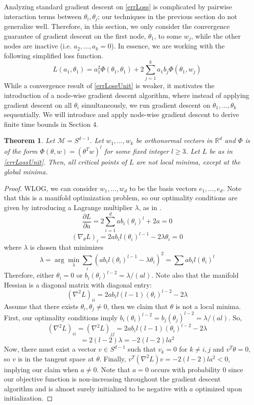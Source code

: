 \documentclass{article}
\newtheorem{theorem}{Theorem}[section]
\newcommand{\R}{{\mathbb{R}}}
\newcommand{\pd}[2]{\frac{\partial#1}{\partial#2}}
\begin{document}
Analyzing standard gradient descent on \eqref{errLoss} is complicated by pairwise interaction terms between $\theta_i, \theta_j$; our techniques in the previous section do not generalize well. Therefore, in this section, we only consider the convergence guarantee of gradient descent on the first node, $\theta_1$, to some $w_j$, while the other nodes are inactive (i.e. $a_2,...,a_k = 0$). In essence, we are working with the following simplified loss function.
\begin{equation}\label{errLossUnit}
L(a_1,\theta_1) =  a_1^2 \Phi(\theta_1,\theta_1)  + 2\sum_{j=1}^k a_1b_j \Phi(\theta_1,w_j)
\end{equation}
While a convergence result of \eqref{errLossUnit} is weaker, it motivates the introduction of a node-wise gradient descent algorithm, where instead of applying gradient descent on all $\theta_i$ simultaneously, we run gradient descent on $\theta_1,...,\theta_k$ sequentially. We will introduce and apply node-wise gradient descent to derive finite time bounds in Section 4.
\begin{theorem}
\label{PolyStrict}
Let $\mathcal{M} = S^{d-1}$. Let $w_1,...,w_k$ be orthonormal vectors in $\R^d$ and $\Phi$ is of the form $\Phi(\theta,w) = (\theta^Tw)^l$ for some fixed integer $l \geq 3$. Let $L$ be as in \eqref{errLossUnit}. Then, all critical points of $L$ are not local minima, except at the global minima. 
\end{theorem}
\begin{proof}
WLOG, we can consider $w_1,...,w_d$ to be the basis vectors $e_1,...,e_d$. Note that this is a manifold optimization problem, so our optimality conditions are given by introducing a Lagrange multiplier $\lambda$, as in \cite{GeHJY15}.
\[\pd{L}{a} = 2\sum_{i=1}^d ab_i (\theta_i)^l + 2a = 0\]
\[ (\nabla_\theta L)_i = 2ab_il(\theta_i)^{l-1}  -2\lambda \theta_i = 0 \]
where $\lambda$ is chosen that minimizes 
\[\lambda = \arg \min_\lambda \sum_i (ab_i l (\theta_i)^{l-1} - \lambda\theta_i)^2 = \sum ab_i l (\theta_i)^l \]
Therefore, either $\theta_i = 0$ or $b_i (\theta_i)^{l-2} = \lambda/(al)$. Note also that the manifold Hessian is a diagonal matrix with diagonal entry: 
\[(\nabla^2 L)_{ii} = 2a b_i l(l-1)(\theta_i)^{l-2} - 2 \lambda\]
Assume that there exists $\theta_i, \theta_j \neq 0$, then we claim that $\theta$ is not a local minima.  First, our optimality conditions imply $b_i(\theta_i)^{l-2} = b_j (\theta_j)^{l-2} = \lambda/(al)$. So,
\[(\nabla^2 L)_{ii} = (\nabla^2L)_{jj} = 2a b_i l(l-1)(\theta_i)^{l-2} - 2 \lambda\]
\[ = 2(l-2)\lambda = -2(l-2)la^2\]
Now, there must exist a vector $v \in S^{d-1}$ such that $v_k = 0$ for $k \neq i,j$ and $v^T\theta = 0$, so $v$ is in the tangent space at $\theta$. Finally, $v^T(\nabla^2 L) v  = -2(l-2)l a^2 < 0$, implying our claim when $a \neq 0$. Note that $a = 0$ occurs with probability 0 since our objective function is non-increasing throughout the gradient descent algorithm and is almost surely initialized to be negative with $a$ optimized upon initialization.
\end{proof}
\end{document}
